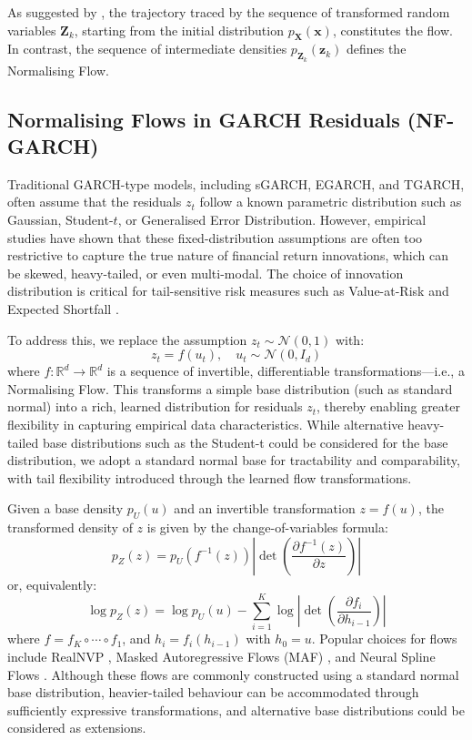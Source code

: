\documentclass[risks,article,submit,pdftex,moreauthors]{Definitions/mdpi}
\begin{document}
As suggested by \cite{kobyzev2020normalising}, the trajectory traced by the sequence of transformed random variables \(\mathbf{Z}_k\), starting from the initial distribution \(p_\mathbf{X}(\mathbf{x})\), constitutes the flow. In contrast, the sequence of intermediate densities \(p_{\mathbf{Z}_k}(\mathbf{z}_k)\) defines the Normalising Flow.\\


\subsection{Normalising Flows in GARCH Residuals (NF-GARCH)}
\noindent 
Traditional GARCH-type models, including sGARCH, EGARCH, and TGARCH, often assume that the residuals \( z_t \) follow a known parametric distribution such as Gaussian, Student-\( t \), or Generalised Error Distribution. However, empirical studies have shown that these fixed-distribution assumptions are often too restrictive to capture the true nature of financial return innovations, which can be skewed, heavy-tailed, or even multi-modal. The choice of innovation distribution is critical for tail-sensitive risk measures such as Value-at-Risk and Expected Shortfall \citep{hansen1994autoregressive, bauwens2006multivariate}.

To address this, we replace the assumption \( z_t \sim \mathcal{N}(0,1) \) with:
\[
z_t = f(u_t), \quad u_t \sim \mathcal{N}(0, I_d)
\]
where \( f: \mathbb{R}^d \rightarrow \mathbb{R}^d \) is a sequence of invertible, differentiable transformations—i.e., a Normalising Flow. This transforms a simple base distribution (such as standard normal) into a rich, learned distribution for residuals \( z_t \), thereby enabling greater flexibility in capturing empirical data characteristics. While alternative heavy-tailed base distributions such as the Student-t could be considered for the base distribution, we adopt a standard normal base for tractability and comparability, with tail flexibility introduced through the learned flow transformations.

Given a base density \( p_U(u) \) and an invertible transformation \( z = f(u) \), the transformed density of \( z \) is given by the change-of-variables formula:
\[
p_Z(z) = p_U(f^{-1}(z)) \left| \det \left( \frac{\partial f^{-1}(z)}{\partial z} \right) \right|
\]
or, equivalently:
\[
\log p_Z(z) = \log p_U(u) - \sum_{i=1}^K \log \left| \det \left( \frac{\partial f_i}{\partial h_{i-1}} \right) \right|
\]
where \( f = f_K \circ \cdots \circ f_1 \), and \( h_i = f_i(h_{i-1}) \) with \( h_0 = u \). Popular choices for flows include RealNVP \citep{dinh2016density}, Masked Autoregressive Flows (MAF) \citep{papamakarios2017masked}, and Neural Spline Flows \citep{durkan2019neural}. Although these flows are commonly constructed using a standard normal base distribution, heavier-tailed behaviour can be accommodated through sufficiently expressive transformations, and alternative base distributions could be considered as extensions.
\end{document}
